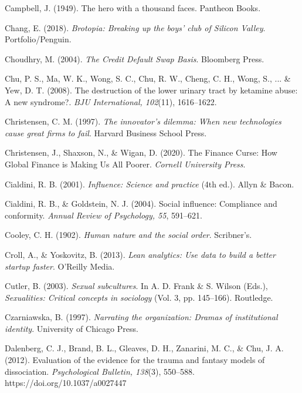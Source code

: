 \begin{thebibliography}{}

    Campbell, J. (1949). The hero with a thousand faces. Pantheon Books.   

    Chang, E. (2018). \textit{Brotopia: Breaking up the boys' club of Silicon Valley}. Portfolio/Penguin.

    Choudhry, M. (2004). \textit{The Credit Default Swap Basis}. Bloomberg Press.

    Chu, P. S., Ma, W. K., Wong, S. C., Chu, R. W., Cheng, C. H., Wong, S., ... \& Yew, D. T. (2008). The destruction of the lower urinary tract by ketamine abuse: A new syndrome?. \textit{BJU International, 102}(11), 1616–1622.

    Christensen, C. M. (1997). \textit{The innovator's dilemma: When new technologies cause great firms to fail}. Harvard Business School Press.

    Christensen, J., Shaxson, N., \& Wigan, D. (2020). The Finance Curse: How Global Finance is Making Us All Poorer. \textit{Cornell University Press}.

    Cialdini, R. B. (2001). \textit{Influence: Science and practice} (4th ed.). Allyn \& Bacon.
    
    Cialdini, R. B., \& Goldstein, N. J. (2004). Social influence: Compliance and conformity. \textit{Annual Review of Psychology, 55}, 591–621.

    Cooley, C. H. (1902). \textit{Human nature and the social order}. Scribner’s.

    Croll, A., \& Yoskovitz, B. (2013). \textit{Lean analytics: Use data to build a better startup faster}. O’Reilly Media.

    Cutler, B. (2003). \textit{Sexual subcultures}. In A. D. Frank \& S. Wilson (Eds.), \textit{Sexualities: Critical concepts in sociology} (Vol. 3, pp. 145--166). Routledge.
    
    Czarniawska, B. (1997). \textit{Narrating the organization: Dramas of institutional identity}. University of Chicago Press.


    Dalenberg, C. J., Brand, B. L., Gleaves, D. H., Zanarini, M. C., \& Chu, J. A. (2012). Evaluation of the evidence for the trauma and fantasy models of dissociation. \textit{Psychological Bulletin, 138}(3), 550–588. https://doi.org/10.1037/a0027447


\end{thebibliography}
